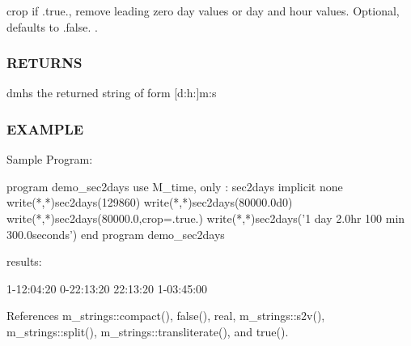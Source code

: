 \begin{DoxyVerb}
crop if .true., remove leading zero day values or day and hour values. Optional, defaults to .false. . \subsubsection*{R\+E\+T\+U\+R\+NS}

dmhs the returned string of form \mbox{[}d\+:h\+:\mbox{]}m\+:s

\subsubsection*{E\+X\+A\+M\+P\+LE}

\begin{DoxyVerb}Sample Program:

 program demo_sec2days
 use M_time, only : sec2days
 implicit none
    write(*,*)sec2days(129860)
    write(*,*)sec2days(80000.0d0)
    write(*,*)sec2days(80000.0,crop=.true.)
    write(*,*)sec2days('1 day 2.0hr 100 min 300.0seconds')
 end program demo_sec2days

results:

 1-12:04:20
 0-22:13:20
 22:13:20
 1-03:45:00 \end{DoxyVerb}
 

References m\+\_\+strings\+::compact(), false(), real, m\+\_\+strings\+::s2v(), m\+\_\+strings\+::split(), m\+\_\+strings\+::transliterate(), and true().


\end{DoxyVerb}
